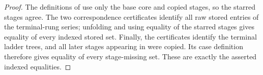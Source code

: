 \begin{proof}
The definitions of  use only the base core
and copied stages, so the starred stages agree.  The two correspondence
certificates identify all raw stored entries of the terminal-rung series;
unfolding  and using equality of the
starred stages gives equality of every indexed stored set.  Finally, the
certificates identify the terminal ladder trees, and all later stages
appearing in  were copied.  Its
case definition therefore gives equality of every stage-missing set.
These are exactly the asserted indexed equalities.
\end{proof}
